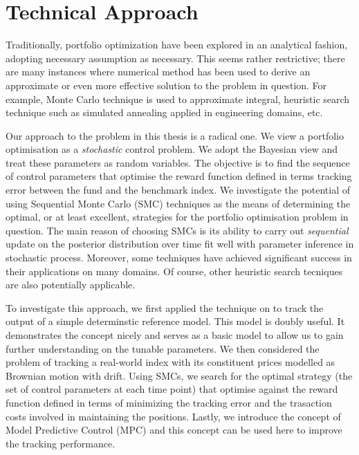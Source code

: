 \section{Technical Approach}
Traditionally, portfolio optimization have been explored in an analytical fashion, adopting necessary assumption as necessary. This seems rather restrictive; there are many instances where numerical method has been used to derive an approximate or even more effective solution to the problem in question. For example, Monte Carlo technique is used to approximate integral, heuristic search technique such as simulated annealing applied in engineering domains, etc.

Our approach to the problem in this thesis is a radical one. We view a portfolio optimisation as a \emph{stochastic} control problem. We adopt the Bayesian view and treat these parameters as random variables. The objective is to find the sequence of control parameters that optimise the reward function defined in terms tracking error between the fund and the benchmark index. We investigate the potential of using Sequential Monte Carlo (SMC) techniques as the means of determining the optimal, or at least excellent, strategies for the portfolio optimisation problem in question. The main reason of choosing SMCs is its ability to carry out \emph{sequential} update on the posterior distribution over time fit well with parameter inference in stochastic process. Moreover, some techniques have achieved significant success in their applications on many domains. Of course, other heuristic search tecniques are also potentially applicable.

To investigate this approach, we first applied the technique on to track the output of a simple determinstic reference model. This model is doubly useful. It demonstrates the concept nicely and serves as a basic model to allow us to gain further understanding on the tunable parameters. We then considered the problem of tracking a real-world index with its constituent prices modelled as Brownian motion with drift. Using SMCs, we search for the optimal strategy (the set of control parameters at each time point) that optimise against the reward function defined in terms of minimizing the tracking error and the trasaction costs involved in maintaining the positions. Lastly, we introduce the concept of Model Predictive Control (MPC) and this concept can be used here to improve the tracking performance.

